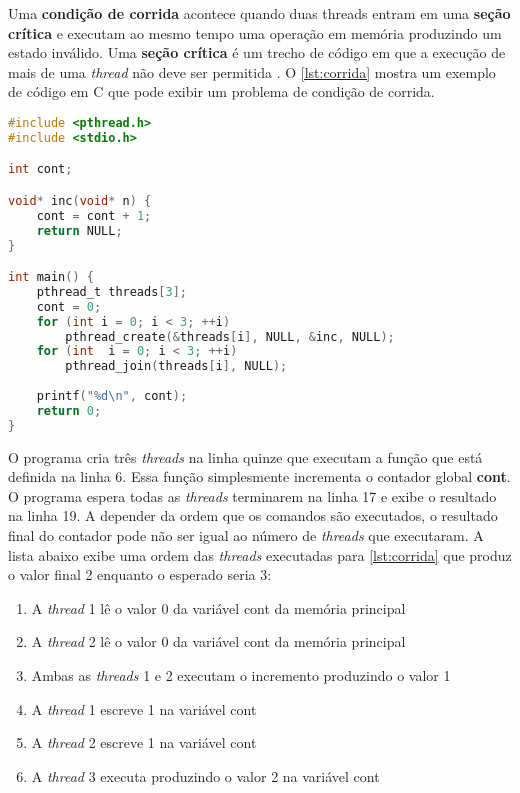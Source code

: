 Uma \textbf{condição de corrida} acontece quando duas threads entram em uma \textbf{seção crítica} e executam ao mesmo tempo uma operação em memória produzindo um estado inválido. Uma \textbf{seção crítica} é um trecho de código em que a execução de mais de uma \textit{thread} não deve ser permitida \cite[p. 206]{Silberschatz2012}. O \autoref{lst:corrida} mostra um exemplo de código em C que pode exibir um problema de condição de corrida. 

\begin{lstlisting}[language=c,label={lst:corrida},caption={Exemplo de programa \textit{multithread} em C onde ocorre uma condição de corrida}]
#include <pthread.h>
#include <stdio.h>

int cont;

void* inc(void* n) {
    cont = cont + 1;
    return NULL;
}

int main() {
    pthread_t threads[3];
    cont = 0;
    for (int i = 0; i < 3; ++i)
        pthread_create(&threads[i], NULL, &inc, NULL);
    for (int  i = 0; i < 3; ++i)
        pthread_join(threads[i], NULL);
        
    printf("%d\n", cont);
    return 0;
}
\end{lstlisting}

O programa cria três \textit{threads} na linha quinze que executam a função que está definida na linha 6. Essa função simplesmente incrementa o contador global \textbf{cont}. O programa espera todas as \textit{threads} terminarem na linha 17 e exibe o resultado na linha 19. A depender da ordem que os comandos são executados, o resultado final do contador pode não ser igual ao número de \textit{threads} que executaram. A lista abaixo exibe uma ordem das \textit{threads} executadas para \autoref{lst:corrida} que produz o valor final 2 enquanto o esperado seria 3:

\begin{enumerate}
 \item A \textit{thread} 1 lê o valor 0 da variável cont da memória principal
 \item A \textit{thread} 2 lê o valor 0 da variável cont da memória principal
 \item Ambas as \textit{threads} 1 e 2 executam o incremento produzindo o valor 1
 \item A \textit{thread} 1 escreve 1 na variável cont
 \item A \textit{thread} 2 escreve 1 na variável cont
 \item A \textit{thread} 3 executa produzindo o valor 2 na variável cont
\end{enumerate}

